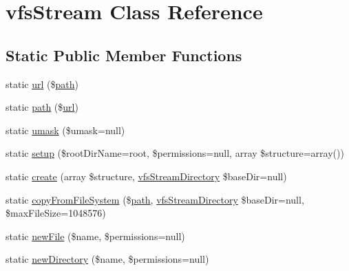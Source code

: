 \hypertarget{classorg_1_1bovigo_1_1vfs_1_1vfs_stream}{}\section{vfs\+Stream Class Reference}
\label{classorg_1_1bovigo_1_1vfs_1_1vfs_stream}
\subsection*{Static Public Member Functions}
\begin{DoxyCompactItemize}
\item 
static \mbox{\hyperlink{classorg_1_1bovigo_1_1vfs_1_1vfs_stream_a1dbaa0b09758fa82fedc57215170496d}{url}} (\$\mbox{\hyperlink{classorg_1_1bovigo_1_1vfs_1_1vfs_stream_a10e779f8d9c06c0d0f4ccea20c16da7f}{path}})
\item 
static \mbox{\hyperlink{classorg_1_1bovigo_1_1vfs_1_1vfs_stream_a10e779f8d9c06c0d0f4ccea20c16da7f}{path}} (\$\mbox{\hyperlink{classorg_1_1bovigo_1_1vfs_1_1vfs_stream_a1dbaa0b09758fa82fedc57215170496d}{url}})
\item 
static \mbox{\hyperlink{classorg_1_1bovigo_1_1vfs_1_1vfs_stream_a9a9ea1dff8c926f2ff9b3c6a5f583823}{umask}} (\$umask=null)
\item 
static \mbox{\hyperlink{classorg_1_1bovigo_1_1vfs_1_1vfs_stream_ad34a51eb551a4b587f9fd7191c3f6896}{setup}} (\$root\+Dir\+Name=\textquotesingle{}root\textquotesingle{}, \$permissions=null, array \$structure=array())
\item 
static \mbox{\hyperlink{classorg_1_1bovigo_1_1vfs_1_1vfs_stream_a96a1398a02095ca9ce344c24e3beaf15}{create}} (array \$structure, \mbox{\hyperlink{classorg_1_1bovigo_1_1vfs_1_1vfs_stream_directory}{vfs\+Stream\+Directory}} \$base\+Dir=null)
\item 
static \mbox{\hyperlink{classorg_1_1bovigo_1_1vfs_1_1vfs_stream_a4de6051823b0cc2581447a1f99b35bab}{copy\+From\+File\+System}} (\$\mbox{\hyperlink{classorg_1_1bovigo_1_1vfs_1_1vfs_stream_a10e779f8d9c06c0d0f4ccea20c16da7f}{path}}, \mbox{\hyperlink{classorg_1_1bovigo_1_1vfs_1_1vfs_stream_directory}{vfs\+Stream\+Directory}} \$base\+Dir=null, \$max\+File\+Size=1048576)
\item 
static \mbox{\hyperlink{classorg_1_1bovigo_1_1vfs_1_1vfs_stream_a8d3891477e360b943175a88c3505f5c9}{new\+File}} (\$name, \$permissions=null)
\item 
static \mbox{\hyperlink{classorg_1_1bovigo_1_1vfs_1_1vfs_stream_a7aafb7859f4a5ce5cd434236fefe121b}{new\+Directory}} (\$name, \$permissions=null)

\end{DoxyCompactItemize}
